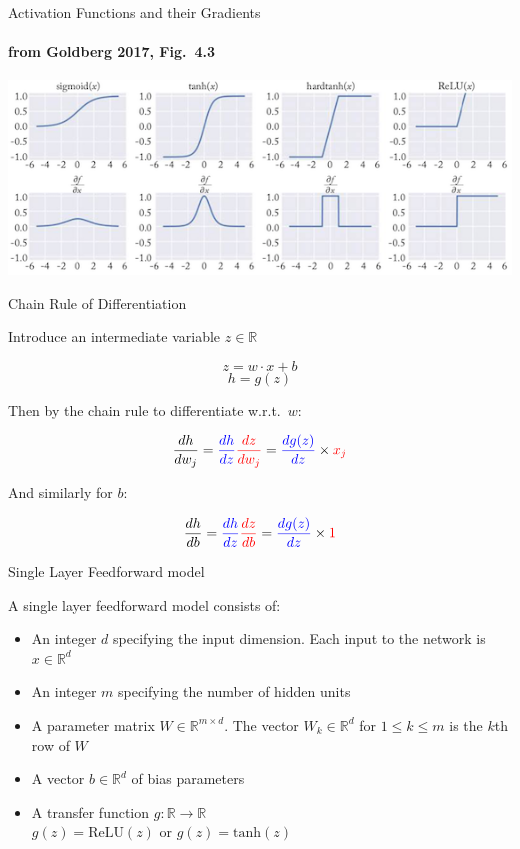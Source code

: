 \begin{frame}{Activation Functions and their Gradients}
\framesubtitle{from Goldberg 2017, Fig.\ 4.3}
\begin{block}{}
\centering
\includegraphics[scale=0.55]{figures/activationfns.png}
\end{block}
\end{frame}

\begin{frame}{Chain Rule of Differentiation}
\begin{block}{}
Introduce an intermediate variable $z \in \mathbb{R}$ 

\[ z = w \cdot x + b \]
\[ h = g(z) \]

Then by the chain rule to differentiate w.r.t.\ $w$:

\[ \frac{dh}{dw_j} = \textcolor{blue}{\frac{dh}{dz}} \textcolor{red}{\frac{dz}{dw_j}} = \textcolor{blue}{\frac{dg(z)}{dz}} \times \textcolor{red}{x_j}\]

\pause
And similarly for $b$:

\[ \frac{dh}{db} = \textcolor{blue}{\frac{dh}{dz}} \textcolor{red}{\frac{dz}{db}}= \textcolor{blue}{\frac{dg(z)}{dz}} \times \textcolor{red}{1}\]

\end{block}
\end{frame}

\begin{frame}{Single Layer Feedforward model}
\begin{block}{A single layer feedforward model consists of:}
\begin{itemize}[<+->]
\item An integer $d$ specifying the input dimension. Each input to the network is $x \in \mathbb{R}^d$
\item An integer $m$ specifying the number of hidden units
\item A parameter matrix $W \in \mathbb{R}^{m \times d}$. The vector $W_k \in \mathbb{R}^d$ for $1 \leq k \leq m$ is the $k$th row of $W$
\item A vector $b \in \mathbb{R}^d$ of bias parameters
\item A transfer function $g : \mathbb{R} \rightarrow \mathbb{R}$\\
$g(z) = \textrm{ReLU}(z)$ or $g(z) = \textrm{tanh}(z)$
\end{itemize}
\end{block}
\end{frame}


